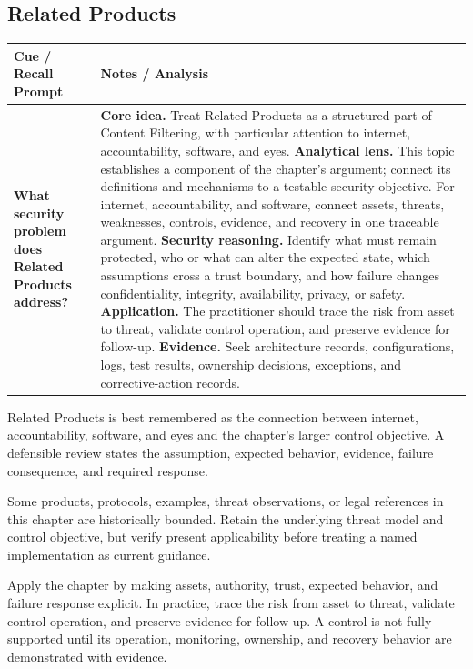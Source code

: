 \documentclass[11pt]{article}
\newcommand{\CornellHeader}{%
\rowcolor{Navy}\color{white}\bfseries Cue / Recall Prompt & \color{white}\bfseries Notes / Analysis\\\hline}
\newcommand{\CornellRow}[2]{%
\cellcolor{CueGray}\RaggedRight\textbf{#1} & \RaggedRight #2\\\hline}
\begin{document}
\subsection*{Related Products}
\begin{longtable}{>{\RaggedRight\arraybackslash}p{}|>{\RaggedRight\arraybackslash}p{}}
\CornellHeader
\CornellRow{What security problem does Related Products address?}{\textbf{Core idea.} Treat Related Products as a structured part of Content Filtering, with particular attention to internet, accountability, software, and eyes. \textbf{Analytical lens.} This topic establishes a component of the chapter's argument; connect its definitions and mechanisms to a testable security objective. For internet, accountability, and software, connect assets, threats, weaknesses, controls, evidence, and recovery in one traceable argument. \textbf{Security reasoning.} Identify what must remain protected, who or what can alter the expected state, which assumptions cross a trust boundary, and how failure changes confidentiality, integrity, availability, privacy, or safety. \textbf{Application.} The practitioner should trace the risk from asset to threat, validate control operation, and preserve evidence for follow-up. \textbf{Evidence.} Seek architecture records, configurations, logs, test results, ownership decisions, exceptions, and corrective-action records.}
\end{longtable}
\begin{topicsummary}
Related Products is best remembered as the connection between internet, accountability, software, and eyes and the chapter's larger control objective. A defensible review states the assumption, expected behavior, evidence, failure consequence, and required response.
\end{topicsummary}
\begin{historybox}
Some products, protocols, examples, threat observations, or legal references in this chapter are historically bounded. Retain the underlying threat model and control objective, but verify present applicability before treating a named implementation as current guidance.
\end{historybox}
\begin{defensebox}
Apply the chapter by making assets, authority, trust, expected behavior, and failure response explicit. In practice, trace the risk from asset to threat, validate control operation, and preserve evidence for follow-up. A control is not fully supported until its operation, monitoring, ownership, and recovery behavior are demonstrated with evidence.
\end{defensebox}
\end{document}
